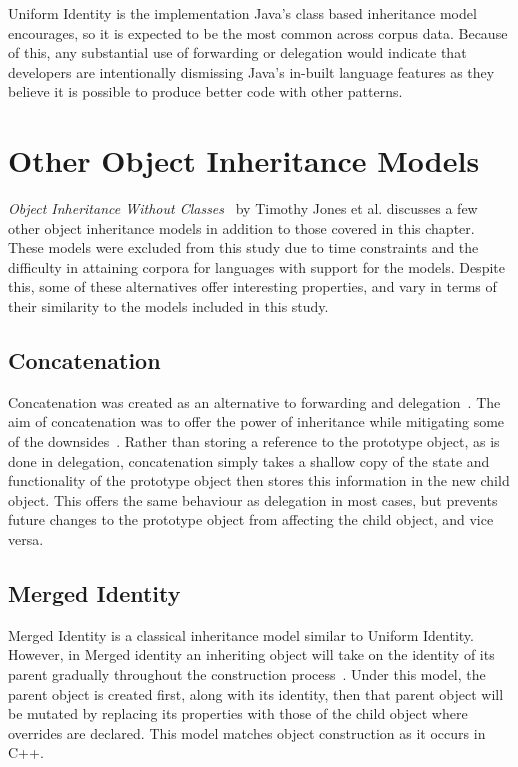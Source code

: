 Uniform Identity is the implementation Java's class based inheritance model encourages, so it is expected to be the most common across corpus data. Because of this, any substantial use of forwarding or delegation would indicate that developers are intentionally dismissing Java's in-built language features as they believe it is possible to produce better code with other patterns.

\section{Other Object Inheritance Models}
\textit{Object Inheritance Without Classes}~\cite{InheritanceWithoutClasses} by Timothy Jones et al. discusses a few other object inheritance models in addition to those covered in this chapter. These models were excluded from this study due to time constraints and the difficulty in attaining corpora for languages with support for the models. Despite this, some of these alternatives offer interesting properties, and vary in terms of their similarity to the models included in this study.

\subsection{Concatenation}
Concatenation was created as an alternative to forwarding and delegation~\cite{InheritanceWithoutClasses}. The aim of concatenation was to offer the power of inheritance while mitigating some of the downsides~\cite{Concatenation}. Rather than storing a reference to the prototype object, as is done in delegation, concatenation simply takes a shallow copy of the state and functionality of the prototype object then stores this information in the new child object. This offers the same behaviour as delegation in most cases, but prevents future changes to the prototype object from affecting the child object, and vice versa.

\subsection{Merged Identity}
Merged Identity is a classical inheritance model similar to Uniform Identity. However, in Merged identity an inheriting object will take on the identity of its parent gradually throughout the construction process~\cite{InheritanceWithoutClasses}. Under this model, the parent object is created first, along with its identity, then that parent object will be mutated by replacing its properties with those of the child object where overrides are declared. This model matches object construction as it occurs in C++.
